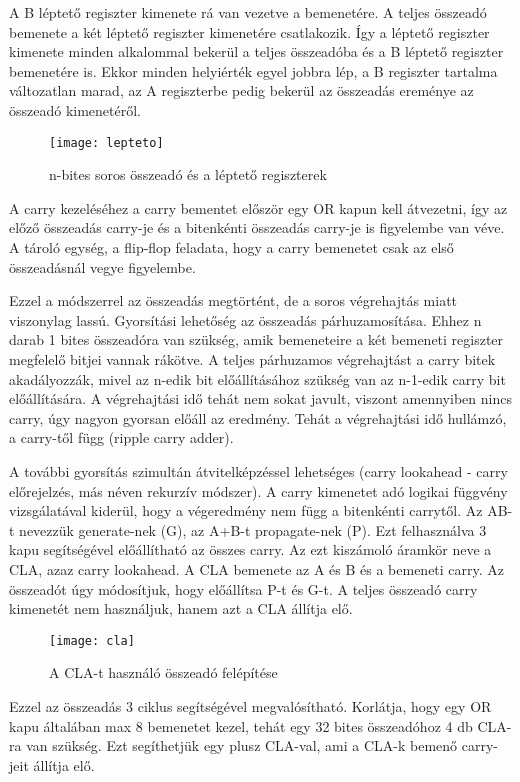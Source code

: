 A B léptető regiszter kimenete rá van vezetve a bemenetére.
A teljes összeadó bemenete a két léptető regiszter kimenetére csatlakozik.
Így a léptető regiszter kimenete minden alkalommal bekerül a teljes összeadóba és a B léptető regiszter bemenetére is.
Ekkor minden helyiérték egyel jobbra lép, a B regiszter tartalma változatlan marad, az A regiszterbe pedig bekerül az összeadás ereménye az összeadó kimenetéről.
\begin{figure}[H]
    \texttt{[image: lepteto]}
    \centering
    \caption{n-bites soros összeadó és a léptető regiszterek}
    \label{fig:lepteto}
\end{figure}
A carry kezeléséhez a carry bementet először egy OR kapun kell átvezetni, így az előző összeadás carry-je és a bitenkénti összeadás carry-je is figyelembe van véve.
A tároló egység, a flip-flop feladata, hogy a carry bemenetet csak az első összeadásnál vegye figyelembe.

Ezzel a módszerrel az összeadás megtörtént, de a soros végrehajtás miatt viszonylag lassú.
Gyorsítási lehetőség az összeadás párhuzamosítása.
Ehhez n darab 1 bites összeadóra van szükség, amik bemeneteire a két bemeneti regiszter megfelelő bitjei vannak rákötve.
A teljes párhuzamos végrehajtást a carry bitek akadályozzák, mivel az n-edik bit előállításához szükség van az n-1-edik carry bit előállítására.
A végrehajtási idő tehát nem sokat javult, viszont amennyiben nincs carry, úgy nagyon gyorsan előáll az eredmény.
Tehát a végrehajtási idő hullámzó, a carry-től függ (ripple carry adder).

A további gyorsítás szimultán átvitelképzéssel lehetséges (carry lookahead - carry előrejelzés, más néven rekurzív módszer).
A carry kimenetet adó logikai függvény vizsgálatával kiderül, hogy a végeredmény nem függ a bitenkénti carrytől.
Az AB-t nevezzük generate-nek (G), az A+B-t propagate-nek (P).
Ezt felhasználva 3 kapu segítségével előállítható az összes carry.
Az ezt kiszámoló áramkör neve a CLA, azaz carry lookahead.
A CLA bemenete az A és B és a bemeneti carry.
Az összeadót úgy módosítjuk, hogy előállítsa P-t és G-t.
A teljes összeadó carry kimenetét nem használjuk, hanem azt a CLA állítja elő.
\begin{figure}[H]
    \texttt{[image: cla]}
    \centering
    \caption{A CLA-t használó összeadó felépítése}
    \label{fig:cla}
\end{figure}
Ezzel az összeadás 3 ciklus segítségével megvalósítható.
Korlátja, hogy egy OR kapu általában max 8 bemenetet kezel, tehát egy 32 bites összeadóhoz 4 db CLA-ra van szükség.
Ezt segíthetjük egy plusz CLA-val, ami a CLA-k bemenő carry-jeit állítja elő.

